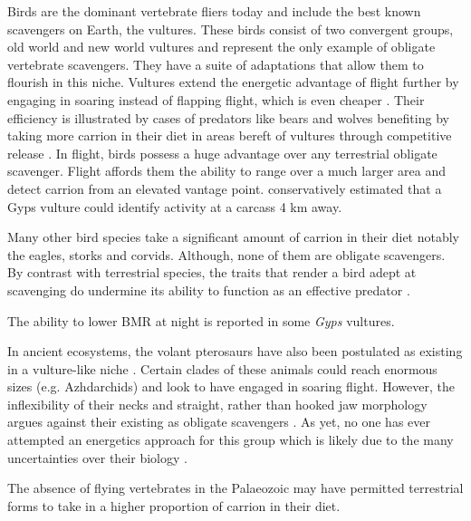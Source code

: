 \documentclass[a4paper,12pt]{article}
\begin{document}
Birds are the dominant vertebrate fliers today and include the best known scavengers on Earth, the vultures. 
These birds consist of two convergent groups, old world and new world vultures and represent the only example of obligate vertebrate scavengers. 
They have a suite of adaptations that allow them to flourish in this niche.
Vultures extend the energetic advantage of flight further by engaging in soaring instead of flapping flight, which is even cheaper \citep{hedenstrom1993migration}.
Their efficiency is illustrated by cases of predators like bears and wolves benefiting by taking more carrion in their diet in areas bereft of vultures through competitive release \citep{devault2003scavenging}. 
In flight, birds possess a huge advantage over any terrestrial obligate scavenger. 
Flight affords them the ability to range over a much larger area and detect carrion from an elevated vantage point.
\cite{pennycuick1972soaring} conservatively estimated that a Gyps vulture could identify activity at a carcass 4 km away. 

Many other bird species take a significant amount of carrion in their diet notably the eagles, storks and corvids. 
Although, none of them are obligate scavengers. 
By contrast with terrestrial species, the traits that render a bird adept at scavenging do undermine its ability to function as an effective predator \citep{devault2003scavenging}. 

The ability to lower BMR at night is reported in some \textit{Gyps} vultures. 

In ancient ecosystems, the volant pterosaurs have also been postulated as existing in a vulture-like niche \citep{witton2008reappraisal}. 
Certain clades of these animals could reach enormous sizes (e.g. Azhdarchids) and look to have engaged in soaring flight. 
However, the inflexibility of their necks and straight, rather than hooked jaw morphology argues against their existing as obligate scavengers \citep{witton2008reappraisal}. 
As yet, no one has ever attempted an energetics approach for this group which is likely due to the many uncertainties over their biology \citep{witton2010size}. 

The absence of flying vertebrates in the Palaeozoic may have permitted terrestrial forms to take in a higher proportion of carrion in their diet. 
\end{document}

